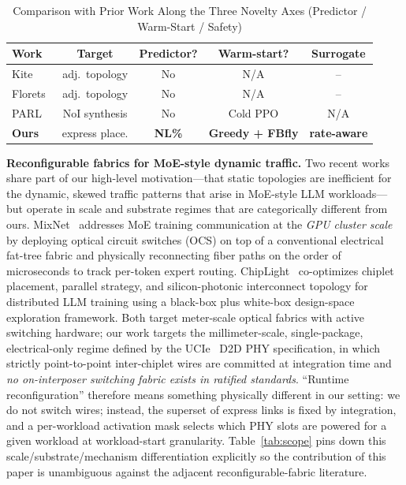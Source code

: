 \documentclass[conference]{IEEEtran}
\begin{document}
\begin{table}[t]
\centering
\caption{Comparison with Prior Work Along the Three Novelty Axes (Predictor / Warm-Start / Safety)}
\label{tab:related}
\scriptsize
\begin{tabular}{lcccc}
\toprule
Work & Target & Predictor? & Warm-start? & Surrogate \\
\midrule
Kite~\cite{kite} & adj.\ topology & No & N/A & -- \\
Florets~\cite{florets} & adj.\ topology & No & N/A & -- \\
PARL~\cite{parl} & NoI synthesis & No & Cold PPO & N/A \\
\textbf{Ours} & express place. & \textbf{NL\%} & \textbf{Greedy + FBfly} & \textbf{rate-aware} \\
\bottomrule
\end{tabular}
\end{table}

\textbf{Reconfigurable fabrics for MoE-style dynamic traffic.}
Two recent works share part of our high-level motivation---that static
topologies are inefficient for the dynamic, skewed traffic patterns that
arise in MoE-style LLM workloads---but operate in scale and substrate
regimes that are categorically different from ours.
MixNet~\cite{mixnet} addresses MoE training communication at the
\emph{GPU cluster scale} by deploying optical circuit switches (OCS) on
top of a conventional electrical fat-tree fabric and physically
reconnecting fiber paths on the order of microseconds to track
per-token expert routing. ChipLight~\cite{chiplight} co-optimizes
chiplet placement, parallel strategy, and silicon-photonic
interconnect topology for distributed LLM training using a black-box
plus white-box design-space exploration framework. Both target meter-scale
optical fabrics with active switching hardware; our work targets the
millimeter-scale, single-package, electrical-only regime defined by the
UCIe~\cite{ucie} D2D PHY specification, in which strictly point-to-point
inter-chiplet wires are committed at integration time and \emph{no
on-interposer switching fabric exists in ratified standards}. ``Runtime
reconfiguration'' therefore means something physically different in our
setting: we do not switch wires; instead, the superset of express links
is fixed by integration, and a per-workload activation mask selects which
PHY slots are powered for a given workload at workload-start granularity.
Table~\ref{tab:scope} pins down this scale/substrate/mechanism
differentiation explicitly so the contribution of this paper is
unambiguous against the adjacent reconfigurable-fabric literature.
\end{document}

